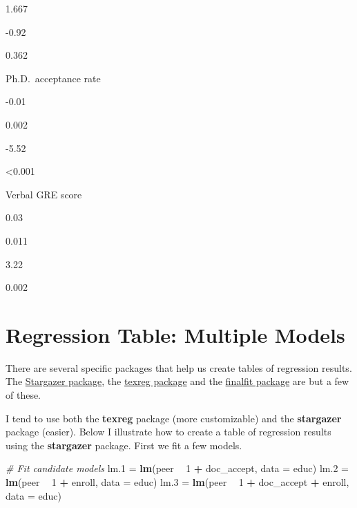 \documentclass[]{book}
\newenvironment{Shaded}{\begin{snugshade}}{\end{snugshade}}
\newcommand{\CommentTok}[1]{\textcolor[rgb]{0.56,0.35,0.01}{\textit{#1}}}
\newcommand{\DataTypeTok}[1]{\textcolor[rgb]{0.13,0.29,0.53}{#1}}
\newcommand{\DecValTok}[1]{\textcolor[rgb]{0.00,0.00,0.81}{#1}}
\newcommand{\FloatTok}[1]{\textcolor[rgb]{0.00,0.00,0.81}{#1}}
\newcommand{\KeywordTok}[1]{\textcolor[rgb]{0.13,0.29,0.53}{\textbf{#1}}}
\newcommand{\NormalTok}[1]{#1}
\newcommand{\OperatorTok}[1]{\textcolor[rgb]{0.81,0.36,0.00}{\textbf{#1}}}
\newcommand{\StringTok}[1]{\textcolor[rgb]{0.31,0.60,0.02}{#1}}
\begin{document}
1.667

-0.92

0.362

Ph.D.~acceptance rate

-0.01

0.002

-5.52

\textless{}0.001

Verbal GRE score

0.03

0.011

3.22

0.002

\hypertarget{regression-table-multiple-models}{%
\section*{Regression Table: Multiple Models}\label{regression-table-multiple-models}}

There are several specific packages that help us create tables of regression results. The \href{https://cran.r-project.org/web/packages/stargazer/vignettes/stargazer.pdf}{Stargazer package}, the \href{https://cran.r-project.org/web/packages/texreg/vignettes/texreg.pdf}{texreg package} and the \href{http://www.datasurg.net/2018/05/16/elegant-regression-results-tables-and-plots-the-finalfit-package/}{finalfit package} are but a few of these.

I tend to use both the \textbf{texreg} package (more customizable) and the \textbf{stargazer} package (easier). Below I illustrate how to create a table of regression results using the \textbf{stargazer} package. First we fit a few models.

\begin{Shaded}
\begin{Highlighting}[]
\CommentTok{# Fit candidate models}
\NormalTok{lm}\FloatTok{.1}\NormalTok{ =}\StringTok{ }\KeywordTok{lm}\NormalTok{(peer }\OperatorTok{~}\StringTok{ }\DecValTok{1} \OperatorTok{+}\StringTok{ }\NormalTok{doc_accept, }\DataTypeTok{data =}\NormalTok{ educ)}
\NormalTok{lm}\FloatTok{.2}\NormalTok{ =}\StringTok{ }\KeywordTok{lm}\NormalTok{(peer }\OperatorTok{~}\StringTok{ }\DecValTok{1} \OperatorTok{+}\StringTok{ }\NormalTok{enroll, }\DataTypeTok{data =}\NormalTok{ educ)}
\NormalTok{lm}\FloatTok{.3}\NormalTok{ =}\StringTok{ }\KeywordTok{lm}\NormalTok{(peer }\OperatorTok{~}\StringTok{ }\DecValTok{1} \OperatorTok{+}\StringTok{ }\NormalTok{doc_accept }\OperatorTok{+}\StringTok{ }\NormalTok{enroll, }\DataTypeTok{data =}\NormalTok{ educ)}
\end{Highlighting}
\end{Shaded}
\end{document}
